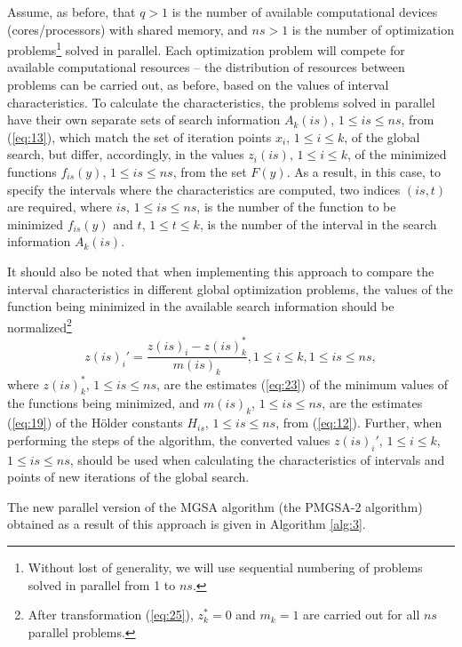 \documentclass[review]{elsarticle}
\begin{document}
Assume, as before, that $q>1$ is the number of available computational devices (cores/processors) with shared memory, and $ns>1$ is the number of optimization problems\footnote{Without lost of generality, we will use sequential numbering of problems solved in parallel from 1 to $ns$.}  solved in parallel. Each optimization problem will compete for available computational resources -- the distribution of resources between problems can be carried out, as before, based on the values of interval characteristics. To calculate the characteristics, the problems solved in parallel have their own separate sets of search information $A_k (is)$, $1 \leq is \leq ns$, from (\ref{eq:13}), which match the set of iteration points $x_i$, $1 \leq i \leq k$, of the global search, but differ, accordingly, in the values $z_i (is)$, $1 \leq i \leq k$, of the minimized functions $f_{is} (y)$, $1 \leq is \leq ns$, from the set $F(y)$. As a result, in this case, to specify the intervals where the characteristics are computed, two indices $( is, t )$ are required, where $is$, $1 \leq is \leq ns$, is the number of the function to be minimized  $f_{is}(y)$ and  $t$, $1 \leq t \leq k$, is the number of the interval in the search information $A_k (is)$.

It should also be noted that when implementing this approach to compare the interval characteristics in different global optimization problems, the values of the function being minimized in the available search information should be normalized\footnote{After transformation (\ref{eq:25}), $z_k^*=0$ and $m_k=1$ are carried out for all $ns$ parallel problems.}
\begin{equation}\label{eq:25}
z(is)_i'=\frac{z(is)_i - z(is)_k^*}{m(is)_k}, 1 \leq i \leq k,1 \leq is \leq ns,
\end{equation}
where $z(is)_k^*$, $1 \leq is \leq ns$, are the estimates (\ref{eq:23}) of the minimum values of the functions being minimized, and $m(is)_k$, $1 \leq is \leq ns$, are the estimates (\ref{eq:19}) of the H\"older constants $H_{is}$, $1 \leq is \leq ns$, from (\ref{eq:12}). Further, when performing the steps of the algorithm, the converted values $z(is)_i'$, $1 \leq i \leq k$, $1 \leq is \leq ns$, should be used when calculating the characteristics of intervals and points of new iterations of the global search.

The new parallel version of the MGSA algorithm (the PMGSA-2 algorithm) obtained as a result of this approach is given in Algorithm \ref{alg:3}.
\end{document}
